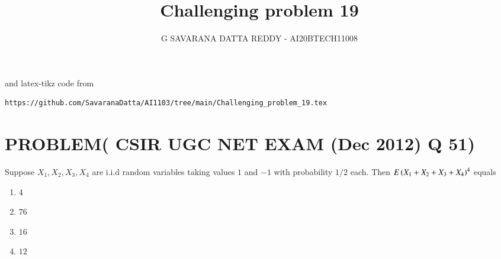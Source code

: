 \documentclass[journal,12pt,twocolumn]{IEEEtran}
\DeclareMathOperator*{\Res}{Res}
\begin{document}
\newtheorem{rem}{Remark}
\newcommand{\sgn}{\mathop{\mathrm{sgn}}}
\providecommand{\abs}[1]{\vert#1\vert}
\providecommand{\res}[1]{\Res\displaylimits_{#1}} 
\providecommand{\norm}[1]{\lVert#1\rVert}
\providecommand{\mtx}[1]{\mathbf{#1}}
\providecommand{\mean}[1]{E[ #1 ]}
\providecommand{\fourier}{\overset{\mathcal{F}}{ \rightleftharpoons}}
\providecommand{\system}{\overset{\mathcal{H}}{ \longleftrightarrow}}
\newcommand{\solution}{\noindent \textbf{Solution: }}
\newcommand{\cosec}{\,\text{cosec}\,}
\providecommand{\dec}[2]{\ensuremath{\overset{#1}{\underset{#2}{\gtrless}}}}
\newcommand*{\permcomb}[4][0mu]{{{}^{#3}\mkern#1#2_{#4}}}
\newcommand*{\perm}[1][-3mu]{\permcomb[#1]{P}}
\newcommand{\myvec}[1]{\ensuremath{\begin{pmatrix}#1\end{pmatrix}}}
\newcommand{\mydet}[1]{\ensuremath{\begin{vmatrix}#1\end{vmatrix}}}
\makeatletter
{}
\makeatother
\let\StandardTheFigure\thefigure
\let\vec\mathbf
\renewcommand{\thefigure}{\theproblem}
\def\putbox#1#2#3{\makebox[0in][l]{\makebox[#1][l]{}\raisebox{\baselineskip}[0in][0in]{\raisebox{#2}[0in][0in]{#3}}}}
     \def\rightbox#1{\makebox[0in][r]{#1}}
     \def\centbox#1{\makebox[0in]{#1}}
     \def\topbox#1{\raisebox{-\baselineskip}[0in][0in]{#1}}
     \def\midbox#1{\raisebox{-0.5\baselineskip}[0in][0in]{#1}}
\vspace{3cm}
\title{Challenging problem 19}
\author{G SAVARANA DATTA REDDY - AI20BTECH11008}
\maketitle
\newpage
\bigskip
\renewcommand{\thetable}{\theenumi}

%
and latex-tikz code from 
%
\begin{lstlisting}
https://github.com/SavaranaDatta/AI1103/tree/main/Challenging_problem_19.tex
\end{lstlisting}
\section{PROBLEM( CSIR UGC NET EXAM (Dec 2012) Q 51)}

Suppose $X_1,X_2,X_3,X_4$ are i.i.d random variables taking values $1$ and $-1$ with probability $1/2$ each. Then $E\left(X_1+X_2 +X_3 +X_4\right)^4$ equals
\begin{multicols}{4}
\begin{enumerate}
    \item $4$
    \item $76$
    \item $16$
    \item $12$
\end{enumerate}
\end{multicols}
\end{document}
